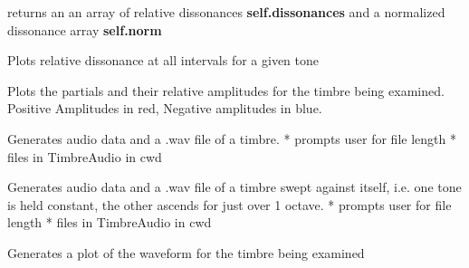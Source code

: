\documentclass[letterpaper,10pt,english]{sphinxmanual}
\begin{document}
\begin{fulllineitems}
\begin{fulllineitems}
returns an an array of relative dissonances \textbf{self.dissonances} and a normalized dissonance array \textbf{self.norm}

\end{fulllineitems}


\begin{fulllineitems}
\label{index:Timbre.timbre.Timbre.disPlot}
Plots relative dissonance at all intervals for a given tone

\end{fulllineitems}


\begin{fulllineitems}
\label{index:Timbre.timbre.Timbre.partialsPlot}
Plots the partials and their relative amplitudes for the timbre being examined. Positive Amplitudes in red, Negative amplitudes in blue.

\end{fulllineitems}


\begin{fulllineitems}
\label{index:Timbre.timbre.Timbre.timbreGen}
Generates audio data and a .wav file of a timbre. 
* prompts user for file length
* files in TimbreAudio in cwd

\end{fulllineitems}


\begin{fulllineitems}
\label{index:Timbre.timbre.Timbre.timbreSweep}
Generates audio data and a .wav file of a timbre swept against itself, i.e. one tone is held constant, the other ascends for just over 1 octave.
* prompts user for file length
* files in TimbreAudio in cwd

\end{fulllineitems}


\begin{fulllineitems}
\label{index:Timbre.timbre.Timbre.wavePlot}
Generates a plot of the waveform for the timbre being examined


\end{fulllineitems}
\end{fulllineitems}
\end{document}
